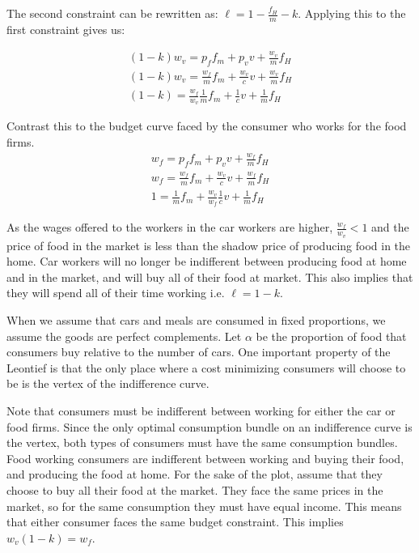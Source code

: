 \documentclass[12pt]{paper}
\begin{document}
The second constraint can be rewritten as:
$\ell = 1 - \frac{f_H}{m} - k$. Applying this to the first constraint
gives us:

\begin{align*}
  (1-k)w_v = p_f f_m + p_v v + \frac{w_v}{m} f_H \\
  (1-k)w_v = \frac{w_f}{m} f_m + \frac{w_v}{c} v + \frac{w_v}{m} f_H\\
  (1-k) = \frac{w_f}{w_v} \frac{1}{m}  f_m + \frac{1}{c} v + \frac{1}{m} f_H
\end{align*}

Contrast this to the budget curve faced by the consumer who works for
the food firms.
\begin{align*}
  w_f = p_f f_m + p_v v + \frac{w_f}{m} f_H\\
  w_f = \frac{w_f}{m} f_m + \frac{w_v}{c} v + \frac{w_f}{m} f_H\\
  1 = \frac{1}{m} f_m + \frac{w_v}{w_f} \frac{1}{c} v + \frac{1}{m} f_H
\end{align*}


As the wages offered to the workers in the car workers are higher,
$\frac{w_f}{w_v} < 1$ and the price of food in the market is less than
the shadow price of producing food in the home. Car workers will
no longer be indifferent between producing food at home and in the
market, and will buy all of their food at market. This also implies
that they will spend all of their time working i.e. $\ell = 1 - k$.

When we assume that cars and meals are consumed in fixed proportions,
we assume the goods are perfect complements. Let $\alpha$ be the proportion
of food that consumers buy relative to the number of cars. One
important property of the Leontief is that the only place where a cost
minimizing consumers will choose to be is the vertex of the
indifference curve.

Note that consumers must be indifferent between working for either the
car or food firms. Since the only optimal consumption bundle on an
indifference curve is the vertex, both types of consumers must have
the same consumption bundles. Food working consumers are indifferent
between working and buying their food, and producing the food at
home. For the sake of the plot, assume that they choose to buy all
their food at the market. They face the same prices in the market, so
for the same consumption they must have equal income. This means that
either consumer faces the same budget constraint.  This implies
$w_v (1-k) = w_f$.
\end{document}
